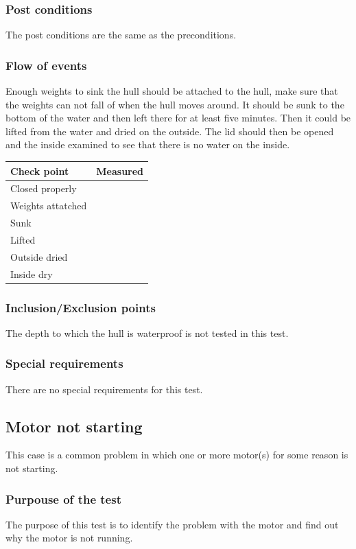 \documentclass[10pt,a4paper]{article}
\begin{document}
\subsubsection*{Post conditions}
The post conditions are the same as the preconditions. 
\subsubsection*{Flow of events}
Enough weights to sink the hull should be attached to the hull, make sure that the weights can not fall of when the hull moves around. It should be sunk to the bottom of the water and then left there for at least five minutes. Then it could be lifted from the water and dried on the outside. The lid should then be opened and the inside examined to see that there is no water on the inside. 

\begin{tabular}{| l | c |}
\hline
Check point & Measured \\ \hline
Closed properly &  \\ \hline
Weights attatched &  \\ \hline
Sunk & \\ \hline
Lifted & \\ \hline
Outside dried & \\ \hline
Inside dry & \\ \hline
\end{tabular}
\subsubsection*{Inclusion/Exclusion points}
The depth to which the hull is waterproof is not tested in this test. 
\subsubsection*{Special requirements}
There are no special requirements for this test. 

\subsection{Motor not starting}
This case is a common problem in which one or more motor(s) for some reason is not starting.
\subsubsection*{Purpouse of the test}
The purpose of this test is to identify the problem with the motor and find out why the motor is not running. 
\end{document}

